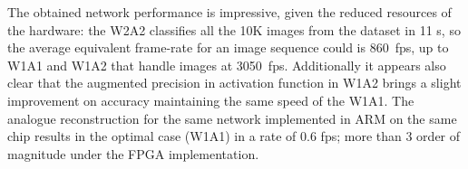 The obtained network performance is impressive, given the reduced resources of the hardware: the W2A2 classifies all the 10K images from the dataset in 11 s, so the average equivalent frame-rate for an image sequence could is 860~fps, up to W1A1 and W1A2 that handle images at 3050~fps. Additionally it appears also clear that the augmented precision in activation function in W1A2 brings a slight improvement on accuracy maintaining the same speed of the W1A1.
The analogue reconstruction for the same network implemented in ARM on the same chip results in the optimal case (W1A1) in a rate of 0.6 fps; more than 3 order of magnitude under the FPGA implementation.

















